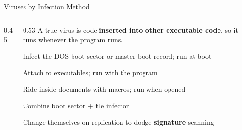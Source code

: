 \documentclass[aspectratio=169,11pt,xcolor={table}]{beamer}
\begin{document}
\begin{frame}{Viruses by Infection Method}
  \begin{columns}[c]
    \begin{column}{0.45\textwidth}
      \centering
    \end{column}
    \begin{column}{0.53\textwidth}
      {\small A true virus is code \textbf{inserted into other executable code}, so it runs whenever the program runs.}
      \begin{description}\small\setlength{\itemsep}{2pt}
        \item[\textcolor{ocean}{Boot sector}] Infect the DOS boot sector or master boot record; run at boot
        \item[\textcolor{leaf!70!black}{File infectors}] Attach to executables; run with the program
        \item[\textcolor{amber!80!black}{Macro}] Ride inside documents with macros; run when opened
        \item[\textcolor{grape}{Multipartite}] Combine boot sector + file infector
        \item[\textcolor{navy}{Polymorphic}] Change themselves on replication to dodge \textbf{signature} scanning
      \end{description}
    \end{column}
  \end{columns}
\end{frame}
\end{document}
